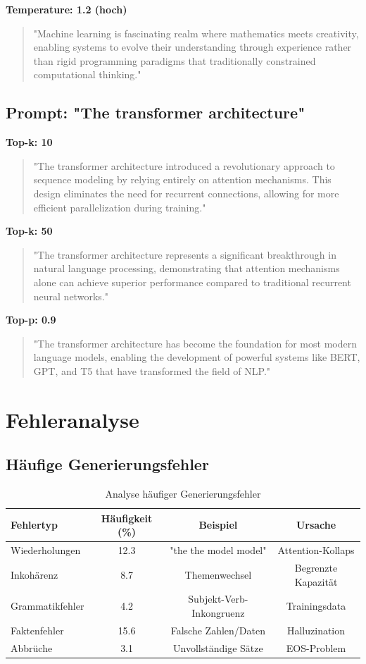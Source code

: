 \textbf{Temperature: 1.2 (hoch)}
\begin{quote}
\small
"Machine learning is fascinating realm where mathematics meets creativity, enabling systems to evolve their understanding through experience rather than rigid programming paradigms that traditionally constrained computational thinking."
\end{quote}

\subsection{Prompt: "The transformer architecture"}

\textbf{Top-k: 10}
\begin{quote}
\small
"The transformer architecture introduced a revolutionary approach to sequence modeling by relying entirely on attention mechanisms. This design eliminates the need for recurrent connections, allowing for more efficient parallelization during training."
\end{quote}

\textbf{Top-k: 50}
\begin{quote}
\small
"The transformer architecture represents a significant breakthrough in natural language processing, demonstrating that attention mechanisms alone can achieve superior performance compared to traditional recurrent neural networks."
\end{quote}

\textbf{Top-p: 0.9}
\begin{quote}
\small
"The transformer architecture has become the foundation for most modern language models, enabling the development of powerful systems like BERT, GPT, and T5 that have transformed the field of NLP."
\end{quote}

\section{Fehleranalyse}

\subsection{Häufige Generierungsfehler}

\begin{table}[h]
\centering
\begin{tabular}{|l|c|c|c|}
\hline
\textbf{Fehlertyp} & \textbf{Häufigkeit (\%)} & \textbf{Beispiel} & \textbf{Ursache} \\
\hline
Wiederholungen & 12.3 & "the the model model" & Attention-Kollaps \\
Inkohärenz & 8.7 & Themenwechsel & Begrenzte Kapazität \\
Grammatikfehler & 4.2 & Subjekt-Verb-Inkongruenz & Trainingsdata \\
Faktenfehler & 15.6 & Falsche Zahlen/Daten & Halluzination \\
Abbrüche & 3.1 & Unvollständige Sätze & EOS-Problem \\
\hline
\end{tabular}
\caption{Analyse häufiger Generierungsfehler}
\label{tab:error_analysis}
\end{table}

